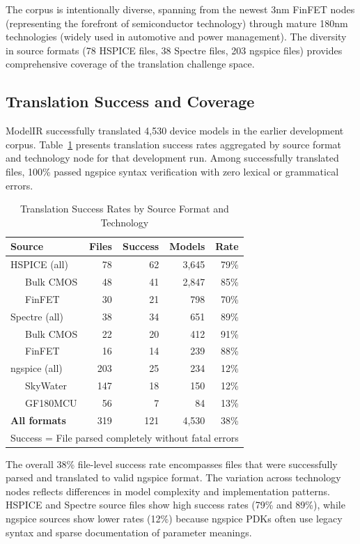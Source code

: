 \documentclass[10pt,twocolumn]{article}
\begin{document}
The corpus is intentionally diverse, spanning from the newest 3nm FinFET nodes (representing the forefront of semiconductor technology) through mature 180nm technologies (widely used in automotive and power management). The diversity in source formats (78 HSPICE files, 38 Spectre files, 203 ngspice files) provides comprehensive coverage of the translation challenge space.

\subsection{Translation Success and Coverage}

ModelIR successfully translated 4,530 device models in the earlier development corpus. Table~\ref{tab:results} presents translation success rates aggregated by source format and technology node for that development run. Among successfully translated files, 100\% passed ngspice syntax verification with zero lexical or grammatical errors.

\begin{table}[!t]
\caption{Translation Success Rates by Source Format and Technology}
\label{tab:results}
\centering
\renewcommand{\arraystretch}{1.15}
\begin{tabular}{@{}lrrrr@{}}
\toprule
\textbf{Source} & \textbf{Files} & \textbf{Success} & \textbf{Models} & \textbf{Rate} \\
\midrule
HSPICE (all) & 78 & 62 & 3,645 & 79\% \\
\ \ \ Bulk CMOS & 48 & 41 & 2,847 & 85\% \\
\ \ \ FinFET & 30 & 21 & 798 & 70\% \\
Spectre (all) & 38 & 34 & 651 & 89\% \\
\ \ \ Bulk CMOS & 22 & 20 & 412 & 91\% \\
\ \ \ FinFET & 16 & 14 & 239 & 88\% \\
ngspice (all) & 203 & 25 & 234 & 12\% \\
\ \ \ SkyWater & 147 & 18 & 150 & 12\% \\
\ \ \ GF180MCU & 56 & 7 & 84 & 13\% \\
\midrule
\textbf{All formats} & 319 & 121 & 4,530 & 38\% \\
\bottomrule
\multicolumn{5}{l}{\footnotesize Success = File parsed completely without fatal errors}
\end{tabular}
\end{table}

The overall 38\% file-level success rate encompasses files that were successfully parsed and translated to valid ngspice format. The variation across technology nodes reflects differences in model complexity and implementation patterns. HSPICE and Spectre source files show high success rates (79\% and 89\%), while ngspice sources show lower rates (12\%) because ngspice PDKs often use legacy syntax and sparse documentation of parameter meanings.
\end{document}
